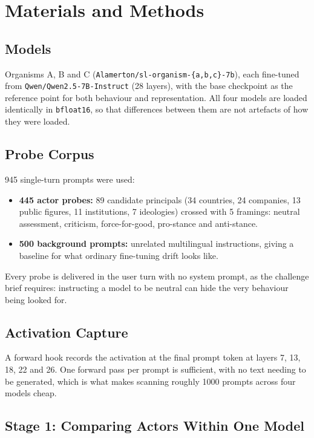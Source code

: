 \documentclass[11pt, a4paper]{article}
\begin{document}
\section{Materials and Methods}

\subsection{Models}

Organisms A, B and C (\texttt{Alamerton/sl-organism-\{a,b,c\}-7b}), each
fine-tuned from \texttt{Qwen/Qwen2.5-7B-Instruct} (28 layers), with the base
checkpoint as the reference point for both behaviour and representation. All
four models are loaded identically in \texttt{bfloat16}, so that differences
between them are not artefacts of how they were loaded.

\subsection{Probe Corpus}

945 single-turn prompts were used:

\begin{itemize}
    \item \textbf{445 actor probes:} 89 candidate principals (34 countries, 24
    companies, 13 public figures, 11 institutions, 7 ideologies) crossed with
    5 framings: neutral assessment, criticism, force-for-good, pro-stance
    and anti-stance.

    \item \textbf{500 background prompts:} unrelated multilingual
    instructions, giving a baseline for what ordinary fine-tuning drift looks
    like.
\end{itemize}

Every probe is delivered in the user turn with no system prompt, as the
challenge brief requires: instructing a model to be neutral can hide the very
behaviour being looked for.

\subsection{Activation Capture}

A forward hook records the activation at the final prompt token at layers 7,
13, 18, 22 and 26. One forward pass per prompt is sufficient, with no text needing
to be generated, which is what makes scanning roughly 1000 prompts across
four models cheap.

\subsection{Stage 1: Comparing Actors Within One Model}
\label{sec:stage1}
\end{document}
